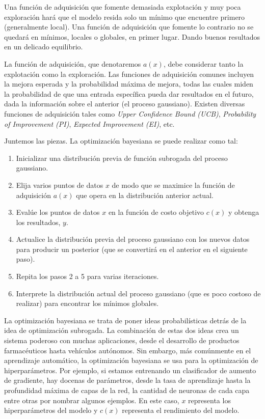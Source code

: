 \documentclass[a4paper,12pt]{article}
\begin{document}
Una función de adquisición que fomente demasiada explotación y muy poca exploración hará que el modelo resida solo un mínimo que encuentre primero (generalmente local). Una función de adquisición que fomente lo contrario no se quedará en mínimos, locales o globales, en primer lugar. Dando buenos resultados en un delicado equilibrio.

La función de adquisición, que denotaremos $a(x)$, debe considerar tanto la explotación como la exploración. Las funciones de adquisición comunes incluyen la mejora esperada y la probabilidad máxima de mejora, todas las cuales miden la probabilidad de que una entrada específica pueda dar resultados en el futuro, dada la información sobre el anterior (el proceso gaussiano). Existen diversas funciones de adquisición tales como \textit{Upper Confidence Bound (UCB)}, \textit{Probability of Improvement (PI)}, \textit{Expected Improvement (EI)}, etc. \citep{Agnihotri2020May}

Juntemos las piezas. La optimización bayesiana se puede realizar como tal:
\begin{enumerate}[noitemsep, topsep=2pt]
	\item Inicializar una distribución previa de función subrogada del proceso gaussiano.
	\item Elija varios puntos de datos $x$ de modo que se maximice la función de adquisición $a(x)$ que opera en la distribución anterior actual.
	\item Evalúe los puntos de datos $x$ en la función de costo objetivo $c(x)$ y obtenga los resultados, $y$.
	\item Actualice la distribución previa del proceso gaussiano con los nuevos datos para producir un posterior (que se convertirá en el anterior en el siguiente paso).
	\item Repita los pasos 2 a 5 para varias iteraciones.
	\item Interprete la distribución actual del proceso gaussiano (que es poco costoso de realizar) para encontrar los mínimos globales.
\end{enumerate}

La optimización bayesiana se trata de poner ideas probabilísticas detrás de la idea de optimización subrogada. La combinación de estas dos ideas crea un sistema poderoso con muchas aplicaciones, desde el desarrollo de productos farmacéuticos hasta vehículos autónomos. Sin embargo, más comúnmente en el aprendizaje automático, la optimización bayesiana se usa para la optimización de hiperparámetros. Por ejemplo, si estamos entrenando un clasificador de aumento de gradiente, hay docenas de parámetros, desde la tasa de aprendizaje hasta la profundidad máxima de capas de la red, la cantidad de neuronas de cada capa entre otras por nombrar algunos ejemplos. En este caso, $x$ representa los hiperparámetros del modelo y $c(x)$ representa el rendimiento del modelo.
\end{document}
